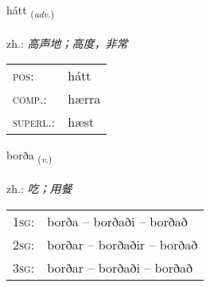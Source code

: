 \documentclass[frontgrid, backgrid]{flacards}\usepackage[]{graphicx}\usepackage[]{xcolor}
\begin{document}
\renewcommand{\flhead}{\vskip5pt \fboxsep=0pt {\small\bfseries\footnotesize Atviksorð | 副词}}
\renewcommand{\fcfoot}{\vskip5pt \fboxsep=0pt \hspace{2pt}{\small\bfseries\footnotesize 1K}}

\renewcommand{\blhead}{\vskip5pt {\small\bfseries\footnotesize Atviksorð | 副词 }}
\renewcommand{\bcfoot}{\vskip5pt \hspace{2pt}{\small\bfseries\footnotesize 1K}}


{hátt \small{\textsubscript{(\textit{adv.})}} \\[1ex] %
\textphonetic{[hauht]} \\
zh.: \emph{高声地；高度，非常} \\  [2ex]
\renewcommand*{\arraystretch}{0.8}
\begin{tabular}{ll}
\textsc{pos}: & hátt \\ 
\textsc{comp.}: & hærra \\ 
\textsc{superl.}: & hæst \\
\end{tabular}
}

\renewcommand{\flhead}{\vskip5pt \fboxsep=0pt {\small\bfseries\footnotesize Sagnorð | 动词}}
\renewcommand{\fcfoot}{\vskip5pt \fboxsep=0pt \hspace{2pt}{\small\bfseries\footnotesize 1K}}

\renewcommand{\blhead}{\vskip5pt {\small\bfseries\footnotesize Sagnorð | 动词 }}
\renewcommand{\bcfoot}{\vskip5pt \hspace{2pt}{\small\bfseries\footnotesize 1K}}


{borða \small{\textsubscript{(\textit{v.})}} \\[1ex] %
\textphonetic{[pɔrða]} \\
zh.: \emph{吃；用餐} \\  [2ex]
\renewcommand*{\arraystretch}{0.8}
\begin{tabular}{p{1cm}l}
\textsc{1sg}: & borða -- borðaði -- borðað \\ 
\textsc{2sg}: & borðar -- borðaðir -- borðað \\ 
\textsc{3sg}: & borðar -- borðaði -- borðað \\ 
\end{tabular}
}
\end{document}
